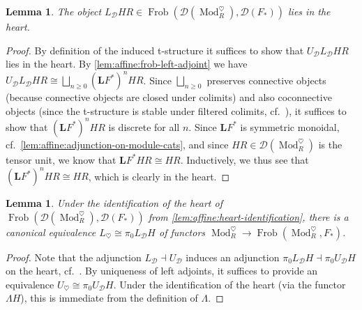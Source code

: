 \documentclass{article}
\theoremstyle{definition}
\theoremstyle{definition}
\theoremstyle{definition}
\theoremstyle{plain}
\newtheorem{lem}[defn]{Lemma}
\theoremstyle{plain}
\theoremstyle{plain}
\theoremstyle{plain}
\theoremstyle{plain}
\theoremstyle{plain}
\theoremstyle{plain}
\theoremstyle{plain}
\theoremstyle{remark}
\theoremstyle{remark}
\theoremstyle{plain}
\theoremstyle{plain}
\theoremstyle{plain}
\theoremstyle{plain}
\theoremstyle{plain}
\newcommand{\ModDisc}[1]{\operatorname{Mod}_{#1}^{\heartsuit}}
\newcommand{\Frob}[2]{\operatorname{Frob}(#1, #2)}
\newcommand{\Cat}[1]{\mathcal{#1}}
\begin{document}
\begin{lem} \label{lem:affine:frob-ring-is-discrete}
    The object $L_{\Cat D} HR \in \Frob{\Cat D(\ModDisc{R})}{\Cat D(F_*)}$ lies in the heart.
\end{lem}
\begin{proof}
    By definition of the induced t-structure it suffices to show that $U_{\Cat D}L_{\Cat D} HR$ lies in the heart.
    By \cref{lem:affine:frob-left-adjoint} we have $U_{\Cat D}L_{\Cat D}HR \cong \bigsqcup_{n \ge 0} (\mathbf{L}F^*)^n HR$.
    Since $\bigsqcup_{n \ge 0}$ preserves 
    connective objects (because connective objects are closed under colimits) and also coconnective objects (since the t-structure 
    is stable under filtered colimits, cf.\ \cite[Proposition 1.3.5.21]{higheralgebra}),
    it suffices to show that $(\mathbf{L}F^*)^n HR$ is discrete for all $n$.
    Since $\mathbf{L}F^*$ is symmetric monoidal, cf.\ \cref{lem:affine:adjunction-on-module-cats}, 
    and since $HR \in \Cat D(\ModDisc{R})$ is the tensor unit, we know that $\mathbf{L}F^* HR \cong HR$.
    Inductively, we thus see that $(\mathbf{L}F^*)^n HR \cong HR$, which is clearly in the heart.
\end{proof}

\begin{lem} \label{lem:affine:L-heart-id}
    Under the identification of the heart of $\Frob{\Cat D(\ModDisc{R})}{\Cat D(F_*)}$ from \cref{lem:affine:heart-identification},
    there is a canonical equivalence $L_\heartsuit \cong \pi_0 L_{\Cat D} H$ of functors $\ModDisc{R} \to \Frob{\ModDisc{R}}{F_*}$.
\end{lem}
\begin{proof}
    Note that the adjunction $L_{\Cat D} \dashv U_{\Cat D}$ 
    induces an adjunction $\pi_0 L_{\Cat D} H \dashv \pi_0 U_{\Cat D} H$ on the heart, cf.\ \cite[Proposition 1.3.17 (iii)]{bbd}.
    By uniqueness of left adjoints, it suffices to provide an equivalence $U_{\heartsuit} \cong \pi_0 U_{\Cat D} H$.
    Under the identification of the heart (via the functor $\Lambda H$),
    this is immediate from the definition of $\Lambda$.
\end{proof}
\end{document}
